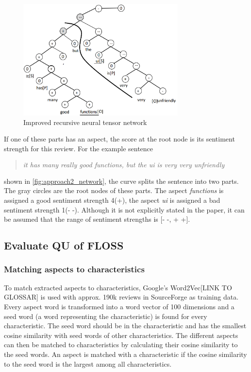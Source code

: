 \begin{figure}
    \centering
    \includegraphics[width=0.75\textwidth]{images/Thema4_Approach2_Network.png}
    \caption{Improved recursive neural tensor network \cite[Figure 2]{Qian2016}}
    \label{fig:approach2_network}
\end{figure}

If one of these parts has an aspect, the score at the root node is its sentiment strength for this review. For the example sentence
\begin{quote}
    \textit{it has many really good functions, but the ui is very very unfriendly}
\end{quote}
shown in \autoref{fig:approach2_network}, the curve splits the sentence into two parts. The gray circles are the root nodes of these parts. The aspect \textit{functions} is assigned a good sentiment strength 4(+), the aspect \textit{ui} is assigned a bad sentiment strength 1(- -). Although it is not explicitly stated in the paper, it can be assumed that the range of sentiment strengths is [- -, + +].

\subsection*{Evaluate QU of FLOSS}

\subsubsection*{Matching aspects to characteristics}
To match extracted aspects to characteristics, Google's Word2Vec[LINK TO GLOSSAR] is used with approx. 190k reviews in SourceForge as training data. Every aspect word is transformed into a word vector of 100 dimensions and a seed word (a word representing the characteristic) is found for every characteristic. The seed word should be in the characteristic and has the smallest cosine similarity with seed words of other characteristics. The different aspects can then be matched to characteristics by calculating their cosine similarity to the seed words. An aspect is matched with a characteristic if the cosine similarity to the seed word is the largest among all characteristics.

